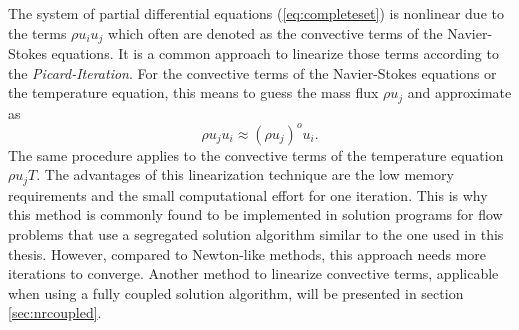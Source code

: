 The system of partial differential equations (\ref{eq:completeset}) is nonlinear due to the terms \(\rho u_i u_j\) which often are denoted as the convective terms of the Navier-Stokes equations. It is a common approach to linearize those terms according to the \emph{Picard-Iteration}. For the convective terms of the Navier-Stokes equations or the temperature equation, this means to guess the mass flux \( \rho u_j\) and approximate as
\begin{displaymath}
  \rho u_j u_i \approx \left( \rho u_j \right)^o u_i.
\end{displaymath}
The same procedure applies to the convective terms of the temperature equation \(\rho u_j T\). The advantages of this linearization technique are the low memory requirements and the small computational effort for one iteration. This is why this method is commonly found to be implemented in solution programs for flow problems that use a segregated solution algorithm similar to the one used in this thesis. However, compared to Newton-like methods, this approach needs more iterations to converge. Another method to linearize convective terms, applicable when using a fully coupled solution algorithm, will be presented in section \ref{sec:nrcoupled}.

